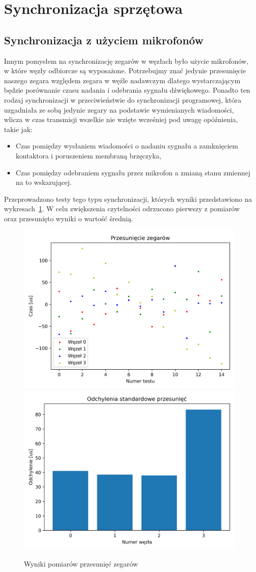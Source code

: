 \section{Synchronizacja sprzętowa}



\subsection{Synchronizacja z użyciem mikrofonów}\label{sec:mic_sync}

Innym pomysłem na synchronizację zegarów w węzłach było użycie mikrofonów, w które węzły odbiorcze są wyposażone. Potrzebujmy znać jedynie przesunięcie naszego zegara względem zegara w węźle nadawczym dlatego wystarczającym będzie porównanie czasu nadania i odebrania sygnału dźwiękowego. Ponadto ten rodzaj synchronizacji w przeciwieństwie do synchronizacji programowej, która uzgadniała ze sobą jedynie zegary na podstawie wymienianych wiadomości, wlicza w czas transmisji wszelkie nie wzięte wcześniej pod uwagę opóźnienia, takie jak:

\begin{itemize}
    \item Czas pomiędzy wysłaniem wiadomości o nadaniu sygnału a zamknięciem kontaktora i poruszeniem membraną brzęczyka,
    \item Czas pomiędzy odebraniem sygnału przez mikrofon a zmianą stanu zmiennej na to wskazującej.
\end{itemize}

Przeprowadzono testy tego typu synchronizacji, których wyniki przedstawiono na wykresach~\ref{pic:mic_sync}. W celu zwiększenia czytelności odrzucono pierwszy z pomiarów oraz przesunięto wyniki o wartość średnią.

\begin{figure}[H]
\centering
    \includegraphics[width=.49\textwidth]{pics/mic_sync/offsets.png}
    \includegraphics[width=.49\textwidth]{pics/mic_sync/stddev_offsets.png}
\caption{Wyniki pomiarów przesunięć zegarów}
\label{pic:mic_sync}
\end{figure}

